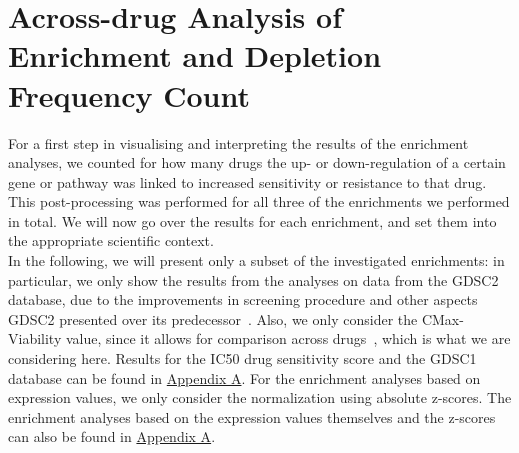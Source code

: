 \section{Across-drug Analysis of Enrichment and Depletion Frequency Count}\label{sec:bidir_bar_plots}
For a first step in visualising and interpreting the results of the enrichment analyses, we counted for how many drugs the up- or down-regulation of a certain gene or pathway was linked to increased sensitivity or resistance to that drug.\\
This post-processing was performed for all three of the enrichments we performed in total. We will now go over the results for each enrichment, and set them into the appropriate scientific context.\\
In the following, we will present only a subset of the investigated enrichments: in particular, we only show the results from the analyses on data from the GDSC2 database, due to the improvements in screening procedure and other aspects GDSC2 presented over its predecessor~\cite{gdsc}. Also, we only consider the CMax-Viability value, since it allows for comparison across drugs~\cite{cmax_viability}, which is what we are considering here. Results for the IC50 drug sensitivity score and the GDSC1 database can be found in \hyperref[appendix:bidir]{Appendix A}. For the enrichment analyses based on expression values, we only consider the normalization using absolute z-scores. The enrichment analyses based on the expression values themselves and the z-scores can also be found in \hyperref[appendix:bidir]{Appendix A}.

